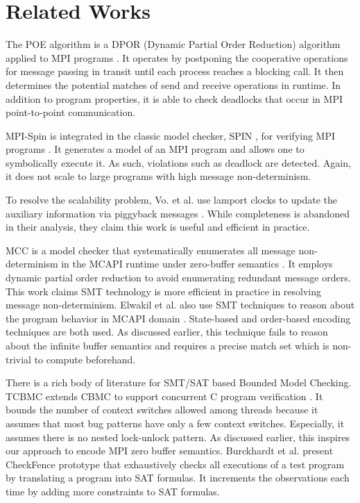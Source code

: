 \section{Related Works}
The POE algorithm is a DPOR (Dynamic Partial Order Reduction) algorithm \cite{DBLP:conf/popl/FlanaganG05} applied to MPI programs \cite{DBLP:conf/ppopp/VakkalankaSGK08}. It operates by postponing the cooperative operations for message passing in transit until each process reaches a blocking call. It then determines the potential matches of send and receive operations in runtime. In addition to program properties, it is able to check deadlocks that occur in MPI point-to-point communication.

MPI-Spin is integrated in the classic model checker, SPIN \cite{DBLP:journals/tse/Holzmann97}, for verifying MPI programs \cite{DBLP:conf/vmcai/Siegel07}. It generates a model of an MPI program and allows one to symbolically execute it. As such, violations such as deadlock are detected. Again, it does not scale to large programs with high message non-determinism.

To resolve the scalability problem, Vo. et al. use lamport clocks to update the auxiliary information via piggyback messages \cite{DBLP:conf/sc/VoAGSSB10, DBLP:conf/IEEEpact/VoGKSSB11}. While completeness is abandoned in their analysis, they claim this work is useful and efficient in practice. 

MCC is a model checker that systematically enumerates all message non-determinism in the MCAPI runtime under zero-buffer semantics \cite{DBLP:conf/fmcad/SharmaGMH09}. It employs dynamic partial order reduction to avoid enumerating redundant message orders. This work claims SMT technology is more efficient in practice in resolving message non-determinism. Elwakil et al. also use SMT techniques to reason about the program behavior in MCAPI domain \cite{DBLP:conf/issta/ElwakilY10}. State-based and order-based encoding techniques are both used. As discussed earlier, this technique fails to reason about the infinite buffer semantics and requires a precise match set which is non-trivial to compute beforehand.

There is a rich body of literature for SMT/SAT based Bounded Model Checking. 
TCBMC extends CBMC \cite{DBLP:conf/tacas/ClarkeKL04} to support concurrent C program verification \cite{DBLP:conf/cav/RabinovitzG05}. It bounds the number of context switches allowed among threads because it assumes that most bug patterns have only a few context switches. Especially, it assumes there is no nested lock-unlock pattern. As discussed earlier, this inspires our approach to encode MPI zero buffer semantics.
Burckhardt et al. present CheckFence prototype \cite{DBLP:conf/pldi/BurckhardtAM07} that exhaustively checks all executions of a test program by translating a program into SAT formulas. It increments the observations each time by adding more constraints to SAT formulas. 
